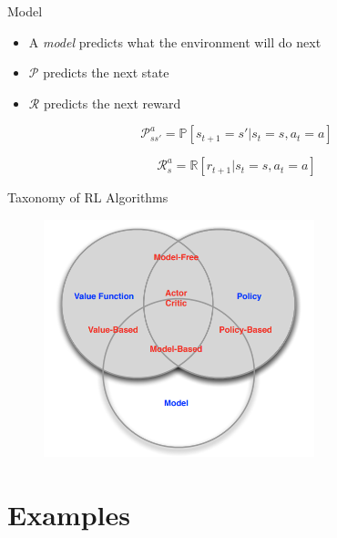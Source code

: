 \documentclass{beamer}
\begin{document}
\begin{frame}{Model}
    \begin{itemize}
        \item A \emph{model} predicts what the environment will do next
        \item $\mathcal{P}$ predicts the next state
        \item $\mathcal{R}$ predicts the next reward
    \end{itemize}
    
    \begin{equation*}
        \mathcal{P}^a_{ss'} = \mathbb{P}[s_{t+1} = s' | s_t=s, a_t=a]
    \end{equation*}
    
    \begin{equation*}
        \mathcal{R}^a_s = \mathbb{R}[r_{t+1} | s_t=s, a_t=a]
    \end{equation*}
\end{frame}

\begin{frame}{Taxonomy of RL Algorithms}
    \begin{figure}
        \centering
        \includegraphics[width=0.7\textwidth]{images/rl_taxonomy}
    \end{figure}
\end{frame}

\section{Examples}
\end{document}
